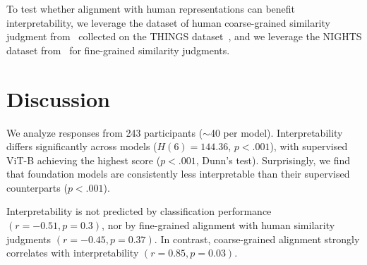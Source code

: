 \documentclass{ccn}
\begin{document}
To test whether alignment with human representations can benefit interpretability, we leverage the dataset of human coarse-grained similarity judgment from~\citet{hebart2020revealing} collected on the THINGS dataset~\citep{hebart2023things}, and we leverage the NIGHTS dataset from~\citep{fu2023dreamsim} for fine-grained similarity judgments.


\section{Discussion}
\vspace{-0.1in}

\begin{table}[h]
\caption{Interpretability, accuracy and alignments score (in $\%$) across models. Chance level is $50\%$ for interpretability and accuracy, and $33\%$ for alignments. \textbf{Bold}: best. \underline{Underline}: second best.}
\label{tab:results}
\vskip 0.05in
\centering
\footnotesize
\setlength{\tabcolsep}{3pt}
\end{table}

We analyze responses from 243 participants ($\sim$40 per model). Interpretability differs significantly across models ($H(6)=144.36$, $p<.001$), with supervised ViT-B achieving the highest score ($p<.001$, Dunn's test). Surprisingly, we find that foundation models are consistently less interpretable than their supervised counterparts ($p<.001$). 

Interpretability is not predicted by classification performance $(r=-0.51, p=0.3)$, nor by fine-grained alignment with human similarity judgments $(r=-0.45, p=0.37)$. In contrast, coarse-grained alignment strongly correlates with interpretability $(r=0.85, p=0.03)$.
\end{document}
